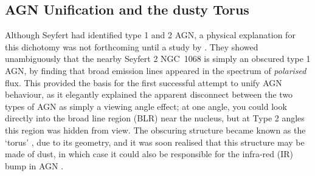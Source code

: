 




\subsection{AGN Unification and the dusty Torus}
\label{agn_unification}

Although Seyfert had identified type 1 and 2 AGN, a physical explanation
for this dichotomy was not forthcoming until a study by \cite[][AM85]{antonucci1985}.
They showed unambiguously that the nearby Seyfert 2 NGC~1068 is simply an obscured
type 1 AGN, by finding that broad emission lines appeared in the spectrum of
{\em polarised} flux. This provided the basis for the first successful attempt
to unify AGN behaviour, as it elegantly 
explained the apparent disconnect between the two types of 
AGN as simply a viewing angle effect; at one angle, you could look directly
into the broad line region (BLR) near the nucleus, but at Type 2 angles
this region was hidden from view.
The obscuring structure became known as the `torus' \citep{krolik1986}, 
due to its geometry, and it was soon realised that this structure
may be made of dust, in which case it could also be responsible for the infra-red (IR)
bump in AGN \citep{neugebauer1979}.

